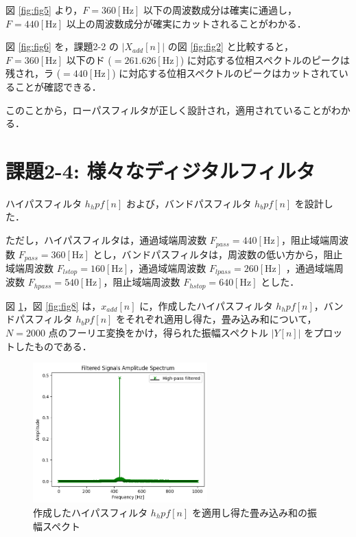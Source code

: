 \documentclass[fleqn, a4paper. 12pt]{jsarticle}
\begin{document}
    図 \ref{fig:fig5} より，$F = 360 [\mathrm{Hz}]$ 以下の周波数成分は確実に通過し，$F = 440[\mathrm{Hz}]$ 以上の周波数成分が確実にカットされることがわかる．

    図 \ref{fig:fig6} を，課題2-2 の $|X_{add}[n]|$ の図 \ref{fig:fig2} と比較すると， $F = 360 [\mathrm{Hz}]$ 以下のド ($ = 261.626 [\mathrm{Hz}]$) に対応する位相スペクトルのピークは残され，ラ ($ = 440 [\mathrm{Hz}]$) に対応する位相スペクトルのピークはカットされていることが確認できる．

    このことから，ローパスフィルタが正しく設計され，適用されていることがわかる．

  \newpage
  
  \section*{課題2-4: 様々なディジタルフィルタ}

    ハイパスフィルタ $h_hpf[n]$ および，バンドパスフィルタ $h_bpf[n]$ を設計した．

    ただし，ハイパスフィルタは，通過域端周波数 $F_{pass} = 440 [\mathrm{Hz}]$，阻止域端周波数 $F_{pass} = 360 [\mathrm{Hz}]$ とし，バンドパスフィルタは，周波数の低い方から，阻止域端周波数 $F_{lstop} = 160 [\mathrm{Hz}]$，通過域端周波数 $F_{lpass} = 260 [\mathrm{Hz}]$ ，通過域端周波数 $F_{hpass} = 540 [\mathrm{Hz}]$，阻止域端周波数 $F_{hstop} = 640 [\mathrm{Hz}]$ とした．

    図 \ref{fig:fig7}，図 \ref{fig:fig8} は，$x_{add}[n]$ に，作成したハイパスフィルタ $h_hpf[n]$，バンドパスフィルタ $h_bpf[n]$ をそれぞれ適用し得た，畳み込み和について，$N = 2000$ 点のフーリエ変換をかけ，得られた振幅スペクトル $|Y[n]|$ をプロットしたものである．
  
    \begin{figure}[!h]
      \centering
      \includegraphics[width=0.6\textwidth]{fig_28.png}
      \caption{作成したハイパスフィルタ $h_hpf[n]$ を適用し得た畳み込み和の振幅スペクト}
      \label{fig:fig7}
    \end{figure}
\end{document}
